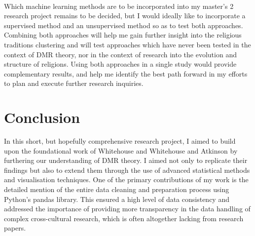 \documentclass[12pt]{report}
\begin{document}
	\\
	Which machine learning methods are to be incorporated into my master’s 2 research project remains to be decided, but I would ideally like to incorporate a supervised method and an unsupervised method so as to test both approaches. Combining both approaches will help me gain further insight into the religious traditions clustering and will test approaches which have never been tested in the context of DMR theory, nor in the context of research into the evolution and structure of religions. Using both approaches in a single study would provide complementary results, and help me identify the best path forward in my efforts to plan and execute further research inquiries. 
	
	\chapter*{Conclusion}
	In this short, but hopefully comprehensive research project, I aimed to build upon the foundational work of Whitehouse  \cite{whitehouse2004modes} and Whitehouse and Atkinson \cite{atkinson2011} by furthering our understanding of DMR theory. I aimed not only to replicate their findings but also to extend them through the use of advanced statistical methods and visualisation techniques. One of the primary contributions of my work is the detailed mention of the entire data cleaning and preparation process using Python’s pandas library. This ensured a high level of data consistency and addressed the importance of providing more transparency in the data handling of complex cross-cultural research, which is often altogether lacking from research papers.\\
	\\
\end{document}
